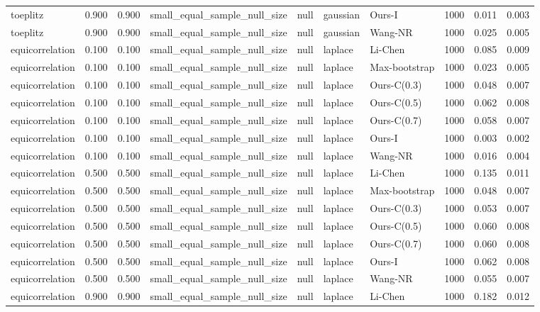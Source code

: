\begin{tabular}{lrrllllrrr}
toeplitz & 0.900 & 0.900 & small\_equal\_sample\_null\_size & null & gaussian & Ours-I & 1000 & 0.011 & 0.003 \\
toeplitz & 0.900 & 0.900 & small\_equal\_sample\_null\_size & null & gaussian & Wang-NR & 1000 & 0.025 & 0.005 \\
equicorrelation & 0.100 & 0.100 & small\_equal\_sample\_null\_size & null & laplace & Li-Chen & 1000 & 0.085 & 0.009 \\
equicorrelation & 0.100 & 0.100 & small\_equal\_sample\_null\_size & null & laplace & Max-bootstrap & 1000 & 0.023 & 0.005 \\
equicorrelation & 0.100 & 0.100 & small\_equal\_sample\_null\_size & null & laplace & Ours-C(0.3) & 1000 & 0.048 & 0.007 \\
equicorrelation & 0.100 & 0.100 & small\_equal\_sample\_null\_size & null & laplace & Ours-C(0.5) & 1000 & 0.062 & 0.008 \\
equicorrelation & 0.100 & 0.100 & small\_equal\_sample\_null\_size & null & laplace & Ours-C(0.7) & 1000 & 0.058 & 0.007 \\
equicorrelation & 0.100 & 0.100 & small\_equal\_sample\_null\_size & null & laplace & Ours-I & 1000 & 0.003 & 0.002 \\
equicorrelation & 0.100 & 0.100 & small\_equal\_sample\_null\_size & null & laplace & Wang-NR & 1000 & 0.016 & 0.004 \\
equicorrelation & 0.500 & 0.500 & small\_equal\_sample\_null\_size & null & laplace & Li-Chen & 1000 & 0.135 & 0.011 \\
equicorrelation & 0.500 & 0.500 & small\_equal\_sample\_null\_size & null & laplace & Max-bootstrap & 1000 & 0.048 & 0.007 \\
equicorrelation & 0.500 & 0.500 & small\_equal\_sample\_null\_size & null & laplace & Ours-C(0.3) & 1000 & 0.053 & 0.007 \\
equicorrelation & 0.500 & 0.500 & small\_equal\_sample\_null\_size & null & laplace & Ours-C(0.5) & 1000 & 0.060 & 0.008 \\
equicorrelation & 0.500 & 0.500 & small\_equal\_sample\_null\_size & null & laplace & Ours-C(0.7) & 1000 & 0.060 & 0.008 \\
equicorrelation & 0.500 & 0.500 & small\_equal\_sample\_null\_size & null & laplace & Ours-I & 1000 & 0.062 & 0.008 \\
equicorrelation & 0.500 & 0.500 & small\_equal\_sample\_null\_size & null & laplace & Wang-NR & 1000 & 0.055 & 0.007 \\
equicorrelation & 0.900 & 0.900 & small\_equal\_sample\_null\_size & null & laplace & Li-Chen & 1000 & 0.182 & 0.012 \\

\end{tabular}
